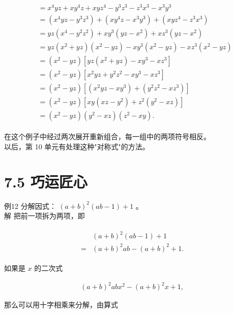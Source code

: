 \documentclass[10pt]{article}
\begin{document}
\begin{align*}
\begin{aligned}
& =x^{4} y z+x y^{4} z+x y z^{4}-y^{3} z^{3}-z^{3} x^{3}-x^{3} y^{3} \\
& =\left(x^{4} y z-y^{3} z^{3}\right)+\left(x y^{4} z-x^{3} y^{3}\right)+\left(x y z^{4}-z^{3} x^{3}\right) \\
& =y z\left(x^{4}-y^{2} z^{2}\right)+x y^{3}\left(y z-x^{2}\right)+x z^{3}\left(y z-x^{2}\right) \\
& =y z\left(x^{2}+y z\right)\left(x^{2}-y z\right)-x y^{3}\left(x^{2}-y z\right)-x z^{3}\left(x^{2}-y z\right) \\
& =\left(x^{2}-y z\right)\left[y z\left(x^{2}+y z\right)-x y^{3}-x z^{3}\right] \\
& =\left(x^{2}-y z\right)\left[x^{2} y z+y^{2} z^{2}-x y^{3}-x z^{3}\right] \\
& =\left(x^{2}-y z\right)\left[\left(x^{2} y z-x y^{3}\right)+\left(y^{2} z^{2}-x z^{3}\right)\right] \\
& =\left(x^{2}-y z\right)\left[x y\left(x z-y^{2}\right)+z^{2}\left(y^{2}-x z\right)\right] \\
& =\left(x^{2}-y z\right)\left(y^{2}-x z\right)\left(z^{2}-x y\right) .
\end{aligned}
\end{align*}

在这个例子中经过两次展开重新组合，每一组中的两项符号相反。\\
以后，第 10 单元有处理这种"对称式"的方法。

\section*{7.5 巧运匠心}
例12 分解因式： $(a+b)^{2}(a b-1)+1$ 。\\
解 把前一项拆为两项，即

\begin{align*}
\begin{aligned}
& (a+b)^{2}(a b-1)+1 \\
= & (a+b)^{2} a b-(a+b)^{2}+1 .
\end{aligned}
\end{align*}

如果是 $x$ 的二次式

\begin{align*}
(a+b)^{2} a b x^{2}-(a+b)^{2} x+1,
\end{align*}

那么可以用十字相乘来分解，由算式
\end{document}

